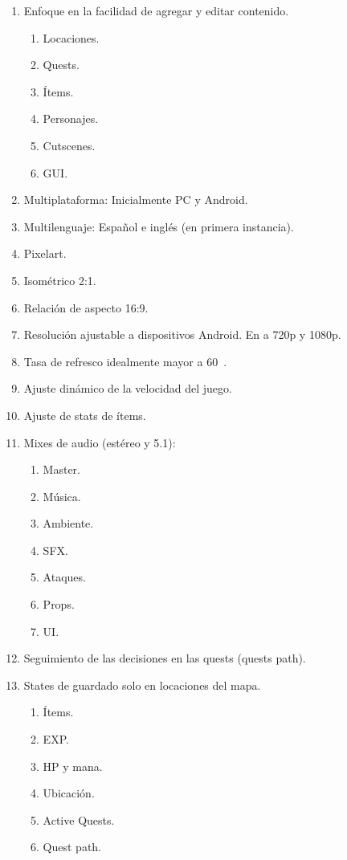 \begin{enumerate}%
	\item Enfoque en la facilidad de agregar y editar contenido.
	\begin{enumerate}[noitemsep]
		\item Locaciones.
		\item Quests.
		\item Ítems.
		\item Personajes.
		\item Cutscenes.
		\item GUI.
	\end{enumerate}
	\item Multiplataforma: Inicialmente PC y Android.
	\item Multilenguaje: Español e inglés (en primera instancia).
	\item Pixelart.
	\item Isométrico 2:1.
	\item Relación de aspecto 16:9.
	\item Resolución ajustable a dispositivos Android. En  a 720p y 1080p.
	\item Tasa de refresco idealmente mayor a 60~.
	\item Ajuste dinámico de la velocidad del juego.
	\item Ajuste de stats de ítems.
	\item Mixes de audio (estéreo y 5.1):
	\begin{enumerate}[noitemsep]
		\item Master.
		\item Música.
		\item Ambiente.
		\item SFX.
		\item Ataques.
		\item Props.
		\item UI.
	\end{enumerate}
	\item Seguimiento de las decisiones en las quests (quests path).
	\item States de guardado solo en locaciones del mapa.
	\begin{enumerate}[noitemsep]
		\item Ítems.
		\item EXP.
		\item HP y mana.
		\item Ubicación.
		\item Active Quests.
		\item Quest path.

\end{enumerate}
\end{enumerate}
